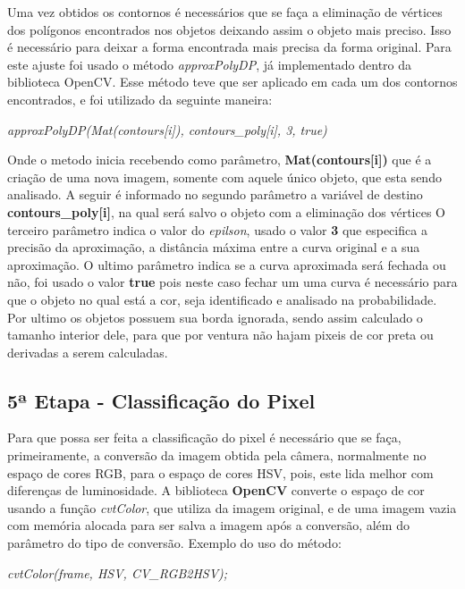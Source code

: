 Uma vez obtidos os contornos é necessários que se faça a eliminação de vértices dos polígonos encontrados nos objetos deixando assim o objeto mais preciso. Isso é necessário para deixar a forma encontrada mais precisa da forma original. Para este ajuste foi usado o método \textit{approxPolyDP}, já implementado dentro da biblioteca OpenCV. Esse método teve que ser aplicado em cada um dos contornos encontrados, e foi utilizado da seguinte maneira:
\begin{center}
\centering \textit{    approxPolyDP(Mat(contours[i]), contours\_poly[i], 3, true)}
\end{center}
 Onde o metodo inicia recebendo como parâmetro, \textbf{Mat(contours[i])} que é a criação de uma nova imagem, somente com aquele único objeto, que esta sendo analisado. A seguir é informado no segundo parâmetro a variável de destino \textbf{contours\_poly[i]}, na qual será salvo o objeto com a eliminação dos vértices O terceiro parâmetro indica o valor do \textit{epilson}, usado o valor \textbf{3} que especifica a precisão da aproximação, a distância máxima entre a curva original e a sua aproximação\cite{OpenCV}. O ultimo parâmetro indica se a curva aproximada será fechada ou não, foi usado o valor \textbf{true} pois neste caso fechar um uma curva é necessário para que o objeto no qual está a cor, seja identificado e analisado na probabilidade.
 Por ultimo os objetos possuem sua borda ignorada, sendo assim calculado o tamanho interior dele, para que por ventura não hajam pixeis de cor preta ou derivadas a serem calculadas.
 
 \subsection{5ª Etapa - Classificação do Pixel}

 
 
 Para que possa ser feita a classificação do pixel é necessário que se faça, primeiramente, a conversão da imagem obtida pela câmera, normalmente no espaço de cores RGB, para o espaço de cores HSV, pois, este lida melhor com diferenças de luminosidade. 
 A biblioteca \textbf{OpenCV} converte o espaço de cor usando a função \textit{cvtColor}, que utiliza da imagem original, e de uma imagem vazia com memória alocada para ser salva a imagem após a conversão, além do parâmetro do tipo de conversão. Exemplo do uso do método:
\begin{center}
\centering \textit{cvtColor(frame, HSV, CV\_RGB2HSV);}
\end{center}

